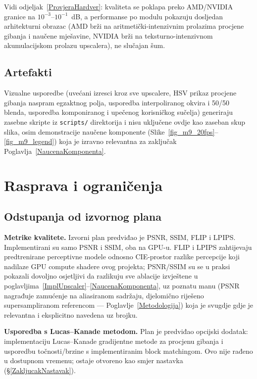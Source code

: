 \documentclass{mathos}
\begin{document}
Vidi odjeljak~\ref{ProvjeraHardver}: kvaliteta se poklapa preko AMD/NVIDIA
granice na $10^{-3}$--$10^{-1}$~dB, a performanse po modulu pokazuju
dosljedan arhitekturni obrazac (AMD brži na aritmetički-intenzivnim
prolazima procjene gibanja i naučene mješavine, NVIDIA brži na
teksturno-intenzivnom akumulacijskom prolazu upscalera), ne slučajan šum.

\section{Artefakti}

Vizualne usporedbe (uvećani izresci kroz sve upscalere, HSV prikaz procjene
gibanja naspram egzaktnog polja, usporedba interpoliranog okvira i 50/50
blenda, usporedba komponiranog i upečenog korisničkog sučelja) generiraju
zasebne skripte iz \verb+scripts/+ direktorija i nisu uključene ovdje kao
zaseban skup slika, osim demonstracije naučene komponente
(Slike~\ref{fig_m9_20fps}--\ref{fig_m9_legend}) koja je izravno relevantna za
zaključak Poglavlja~\ref{NaucenaKomponenta}.


\chapter{Rasprava i ograničenja}\label{Rasprava}

\section{Odstupanja od izvornog plana}

\textbf{Metrike kvalitete.} Izvorni plan predviđao je PSNR, SSIM, FLIP i
LPIPS. Implementirani su samo PSNR i SSIM, oba na GPU-u. FLIP i LPIPS
zahtijevaju predtrenirane perceptivne modele odnosno CIE-prostor razlike
percepcije koji nadilaze GPU compute shadere ovog projekta; PSNR/SSIM su se
u praksi pokazali dovoljno osjetljivi da razlikuju sve ablacije izvještene u
poglavljima~\ref{ImplUpscaler}--\ref{NaucenaKomponenta}, uz poznatu manu
(PSNR nagrađuje zamućenje na aliasiranom sadržaju, djelomično riješeno
supersampliranom referencom — Poglavlje~\ref{Metodologija}) koja je svugdje
gdje je relevantna i eksplicitno navedena uz brojku.

\textbf{Usporedba s Lucas--Kanade metodom.} Plan je predviđao opcijski
dodatak: implementaciju Lucas--Kanade gradijentne metode za procjenu gibanja
i usporedbu točnosti/brzine s implementiranim block matchingom. Ovo nije
rađeno u dostupnom vremenu; ostaje otvoreno kao smjer nastavka
(\S\ref{ZakljucakNastavak}).
\end{document}
